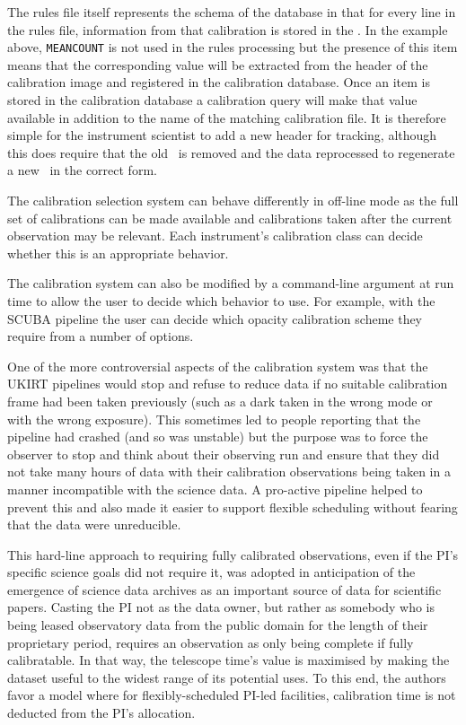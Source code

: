 \documentclass[final,authoryear,5p,times,twocolumn]{elsarticle}
\begin{document}
The rules file itself represents the schema of the database in
that for every line in the rules file, information from that
calibration is stored in the \Index. In the example above,
\texttt{MEANCOUNT} is not used in the rules processing but the
presence of this item means that the corresponding value will be
extracted from the header of the calibration image and registered in
the calibration database. Once an item is stored in the calibration
database a calibration query will make that value available in
addition to the name of the matching calibration file.
It is therefore simple for the instrument
scientist to add a new header for tracking, although this does require
that the old \Index\ is removed and the data reprocessed to regenerate
a new \Index\ in the correct form.

The calibration selection system can behave differently in off-line
mode as the full set of calibrations can be made available and
calibrations taken after the current observation may be relevant. Each
instrument's calibration class can decide whether this is an
appropriate behavior.

The calibration system can also be modified by a command-line argument at
run time to allow the user to decide which behavior to use. For
example, with the SCUBA pipeline \citep{1999ASPC..172..171J} the user
can decide which opacity calibration scheme they require from a number
of options.

One of the more controversial aspects of the calibration system was
that the UKIRT pipelines would stop and refuse to reduce data if no
suitable calibration frame had been taken previously (such as a dark
taken in the wrong mode or with the wrong exposure). This sometimes
led to people reporting that the pipeline had crashed (and so was
unstable) but the purpose was to force the observer to stop and think
about their observing run and ensure that they did not take many hours
of data with their calibration observations being taken in a manner
incompatible with the science data. A pro-active pipeline helped to
prevent this and also made it easier to support flexible scheduling
\citep{2002ASPC..281..488E,2004SPIE.5493...24A} without fearing that
the data were unreducible.

This hard-line approach to requiring fully calibrated observations,
even if the PI's specific science goals did not require it, was
adopted in anticipation of the emergence of science data archives as
an important source of data for scientific papers. Casting the PI not
as the data owner, but rather as somebody who is being leased
observatory data from the public domain for the length of their
proprietary period, requires an observation as only being complete if
fully calibratable. In that way, the telescope time's value is
maximised by making the dataset useful to the widest range of its
potential uses. To this end, the authors favor a model where for
flexibly-scheduled PI-led facilities, calibration time is not deducted
from the PI's allocation.
\end{document}
